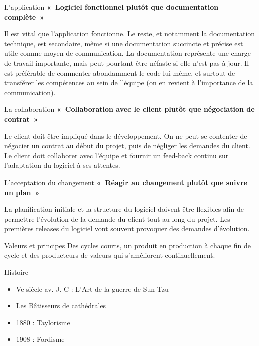 \documentclass{beamer}
\begin{document}
\begin{frame}{L'application}
  \textbf{«~Logiciel fonctionnel plutôt que documentation complète~»}
  \vspace{8mm}

  Il est vital que l'application fonctionne. Le reste, et notamment la documentation technique, est secondaire, même si une documentation succincte et précise est utile comme moyen de communication. La documentation représente une charge de travail importante, mais peut pourtant être néfaste si elle n'est pas à jour. Il est préférable de commenter abondamment le code lui-même, et surtout de transférer les compétences au sein de l'équipe (on en revient à l'importance de la communication).
\end{frame}

\begin{frame}{La collaboration}
  \textbf{«~Collaboration avec le client plutôt que négociation de contrat~»}
  \vspace{8mm}

  Le client doit être impliqué dans le développement. On ne peut se contenter de négocier un contrat au début du projet, puis de négliger les demandes du client. Le client doit collaborer avec l'équipe et fournir un feed-back continu sur l'adaptation du logiciel à ses attentes.
\end{frame}

\begin{frame}{L'acceptation du changement}
  \textbf{«~Réagir au changement plutôt que suivre un plan~»}
  \vspace{8mm}

  La planification initiale et la structure du logiciel doivent être flexibles afin de permettre l'évolution de la demande du client tout au long du projet. Les premières releases du logiciel vont souvent provoquer des demandes d'évolution.
\end{frame}

\begin{frame}{Valeurs et principes}
  \Large Des cycles courts, un produit en production à chaque fin de cycle et des producteurs de valeurs qui s'améliorent continuellement.
\end{frame}

\begin{frame}{Histoire}
  \begin{itemize}
    \item Ve siècle av. J.-C : L'Art de la guerre de Sun Tzu
    \item Les Bâtisseurs de cathédrales
    \item 1880 : Taylorisme
    \item 1908 : Fordisme
  \end{itemize}
\end{frame}
\end{document}
